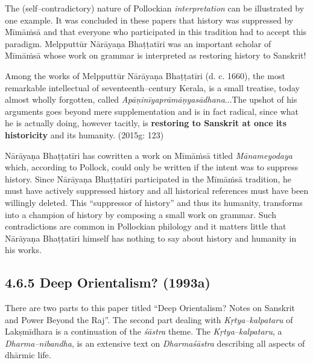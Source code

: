 The (self–contradictory) nature of Pollockian \textit{interpretation} can be illustrated by one example. It was concluded in these papers that history was suppressed by Mīmāṁsā and that everyone who participated in this tradition had to accept this paradigm. Melpputtūr Nārāyaṇa Bhaṭṭatīri was an important scholar of Mīmāṁsā whose work on grammar is interpreted as restoring history to Sanskrit!

\begin{myquote}
Among the works of Melpputtūr Nārāyaṇa Bhaṭṭatīri (d. c. 1660), the most remarkable intellectual of seventeenth–century Kerala, is a small treatise, today almost wholly forgotten, called \textit{Apāṇinīyaprāmāṇyasādhana}\-...The upshot of his arguments goes beyond mere supplementation and is in fact radical, since what he is actually doing, however tacitly, is \textbf{restoring to Sanskrit at once its historicity} and its humanity. (2015g: 123)
\end{myquote}

Nārāyaṇa Bhaṭṭatīri has cowritten a work on Mīmāṁsā	titled \textit{Mānameyodaya} which, according to Pollock, could only be written if the intent was to suppress history. Since Nārāyaṇa Bhaṭṭatīri participated in the Mīmāṁsā tradition, he must have actively suppressed history and all historical references must have been willingly deleted. This “suppressor of history” and thus its humanity, transforms into a champion of history by composing a small work on grammar. Such contradictions are common in Pollockian philology and it matters little that Nārāyaṇa Bhaṭṭatīri himself has nothing to say about history and humanity in his works.

\newpage

\subsection*{4.6.5 Deep Orientalism? (1993a)}

\vspace{-.3cm}

There are two parts to this paper titled “Deep Orientalism? Notes on Sanskrit and Power Beyond the Raj”. The second part dealing with \textit{Kṛtya–kalpataru} of Lakṣmīdhara is a continuation of the \textit{śāstra} theme. The \textit{Kṛtya–kalpataru}, a \textit{Dharma–nibandha}, is an extensive text on \textit{Dharmaśāstra} describing all aspects of dhārmic life.

